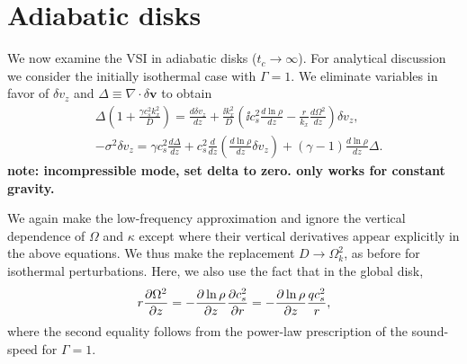 \section{Adiabatic disks} 
We now examine the VSI in adiabatic disks ($t_c\to\infty$). For 
analytical discussion we consider the initially isothermal case with 
$\Gamma=1$. We eliminate variables in favor of $\delta v_z$ and
$\Delta \equiv \nabla\cdot\delta\bm{v}$ to obtain
\begin{align}
&\Delta\left(1 + \frac{\gamma c_s^2 k_x^2}{D}\right) = \frac{d\delta
  v_z}{dz} + \frac{\ii k_x^2}{D}\left(\ii c_s^2 \frac{d\ln\rho}{dz}
  - \frac{r}{k_x}\frac{d\Omega^2}{dz}\right)\delta v_z,\label{adia_iso1}\\
& -\sigma^2\delta v_z = \gamma c_s^2 \frac{d\Delta}{dz} +
 c_s^2\frac{d}{dz}\left(\frac{d\ln\rho}{dz}\delta v_z\right) +
 \left(\gamma-1\right)\frac{d\ln\rho}{dz} \Delta.\label{adia_iso2}
\end{align}
{\bf note: incompressible mode, set delta to zero. only works for
  constant gravity.}

We again make the low-frequency approximation
and ignore the vertical dependence of $\Omega$ and $\kappa$ except
where their vertical derivatives appear explicitly in the above
equations. We thus make the replacement $D\to \Omega_k^2$, as before
for isothermal perturbations. Here, we also use
the fact that in the global disk,
\begin{align}
  r\frac{\partial \Omega^2}{\partial z} = - \frac{\partial\ln\rho}{\partial z}\frac{\partial
    c_s^2}{\partial r} = -\frac{\partial \ln\rho}{\partial z} \frac{qc_s^2}{r},
\end{align}
where the second equality follows from the power-law prescription of
the sound-speed for $\Gamma=1$. 

